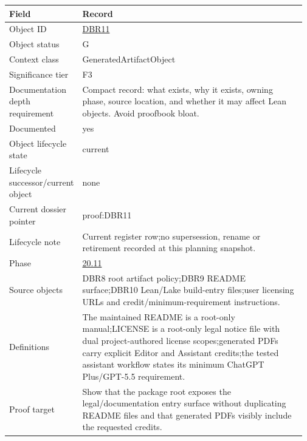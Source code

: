 \begin{longtable}{L{0.16\linewidth} L{0.81\linewidth}}
\hline
\textbf{Field} & \textbf{Record}\\
\hline
Object ID & \hyperlink{object-row-DBR11}{DBR11}\\
\hline\addlinespace[0.20em]
Object status & G\\
\hline\addlinespace[0.20em]
Context class & GeneratedArtifactObject\\
\hline\addlinespace[0.20em]
Significance tier & F3\\
\hline\addlinespace[0.20em]
Documentation depth requirement & Compact record: what exists, why it exists, owning phase, source location, and whether it may affect Lean objects. Avoid proofbook bloat.\\
\hline\addlinespace[0.20em]
Documented & yes\\
\hline\addlinespace[0.20em]
Object lifecycle state & current\\
\hline\addlinespace[0.20em]
Lifecycle successor/\allowbreak{}current object & none\\
\hline\addlinespace[0.20em]
Current dossier pointer & proof:DBR11\\
\hline\addlinespace[0.20em]
Lifecycle note & Current register row;\newline no supersession, rename or retirement recorded at this planning snapshot.\\
\hline\addlinespace[0.20em]
Phase & \hyperlink{phase-row-20-11}{20.11}\\
\hline\addlinespace[0.20em]
Source objects & DBR8 root artifact policy;\newline DBR9 README surface;\newline DBR10 Lean/\allowbreak{}Lake build-entry files;\newline user licensing URLs and credit/\allowbreak{}minimum-requirement instructions.\\
\hline\addlinespace[0.20em]
Definitions & The maintained README is a root-only manual;\newline LICENSE is a root-only legal notice file with dual project-authored license scopes;\newline generated PDFs carry explicit Editor and Assistant credits;\newline the tested assistant workflow states its minimum ChatGPT Plus/\allowbreak{}GPT-5.5 requirement.\\
\hline\addlinespace[0.20em]
Proof target & Show that the package root exposes the legal/\allowbreak{}documentation entry surface without duplicating README files and that generated PDFs visibly include the requested credits.\\

\end{longtable}
